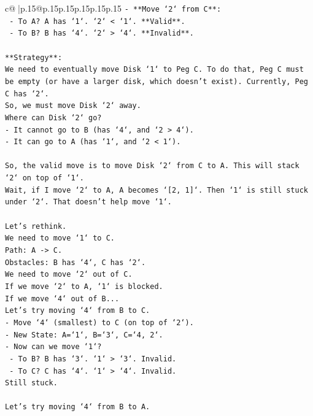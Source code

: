 \documentclass{article}
\begin{document}
{\begin{supertabular}{c@{$\;$}|p{.15\linewidth}@{}p{.15\linewidth}p{.15\linewidth}p{.15\linewidth}p{.15\linewidth}p{.15\linewidth}}
{{{\texttt{{-} **Move `2` from C**:} \\
\texttt{  {-} To A? A has `1`. `2` < `1`. **Valid**.} \\
\texttt{  {-} To B? B has `4`. `2` > `4`. **Invalid**.} \\
\\ 
\texttt{**Strategy**:} \\
\texttt{We need to eventually move Disk `1` to Peg C. To do that, Peg C must be empty (or have a larger disk, which doesn't exist). Currently, Peg C has `2`.} \\
\texttt{So, we must move Disk `2` away.} \\
\texttt{Where can Disk `2` go?} \\
\texttt{{-} It cannot go to B (has `4`, and `2 > 4`).} \\
\texttt{{-} It can go to A (has `1`, and `2 < 1`).} \\
\\ 
\texttt{So, the valid move is to move Disk `2` from C to A. This will stack `2` on top of `1`.} \\
\texttt{Wait, if I move `2` to A, A becomes `{[}2, 1{]}`. Then `1` is still stuck under `2`. That doesn't help move `1`.} \\
\\ 
\texttt{Let's rethink.} \\
\texttt{We need to move `1` to C.} \\
\texttt{Path: A {-}> C.} \\
\texttt{Obstacles: B has `4`, C has `2`.} \\
\texttt{We need to move `2` out of C.} \\
\texttt{If we move `2` to A, `1` is blocked.} \\
\texttt{If we move `4` out of B...} \\
\texttt{Let's try moving `4` from B to C.} \\
\texttt{{-} Move `4` (smallest) to C (on top of `2`).} \\
\texttt{{-} New State: A=`1`, B=`3`, C=`4, 2`.} \\
\texttt{{-} Now can we move `1`?} \\
\texttt{  {-} To B? B has `3`. `1` > `3`. Invalid.} \\
\texttt{  {-} To C? C has `4`. `1` > `4`. Invalid.} \\
\texttt{Still stuck.} \\
\\ 
\texttt{Let's try moving `4` from B to A.} \\
}}}
\end{supertabular}}
\end{document}
